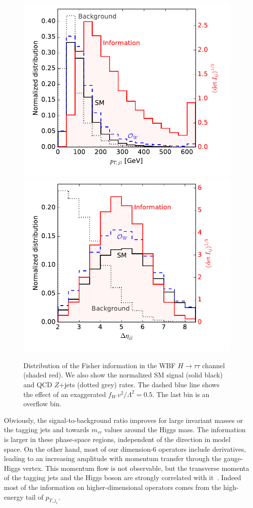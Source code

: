 \begin{figure}
  \includegraphics[height=0.45 \textwidth]{fig/information/wbf_tautau_information_over_ptj}%
  \includegraphics[height=0.45 \textwidth]{fig/information/wbf_tautau_information_over_deltaeta}%
  \caption{Distribution of the Fisher information in the WBF $H \to
    \tau \tau$ channel (shaded red). We also show the normalized SM signal
    (solid black) and QCD $Z$+jets (dotted grey) rates. The dashed blue line
    shows the effect of an exaggerated $f_{W} \, v^2 / \Lambda^2 =
    0.5$. The last bin is an overflow bin.}
  \label{fig:information_wbf_tautau_differential_information}
\end{figure}

Obviously, the signal-to-background ratio improves for large invariant
masses or the tagging jets and towards $m_{\tau \tau}$ values around
the Higgs mass. The information is larger in these phase-space
regions, independent of the direction in model space.  On the other
hand, most of our dimension-6 operators include derivatives, leading
to an increasing amplitude with momentum transfer through the
gauge-Higgs vertex. This momentum flow is not observable, but the
transverse momenta of the tagging jets and the Higgs boson are
strongly correlated with it~\cite{eft-edge}. Indeed most of the
information on higher-dimensional operators comes from the high-energy
tail of $p_{T,j_1}$.

